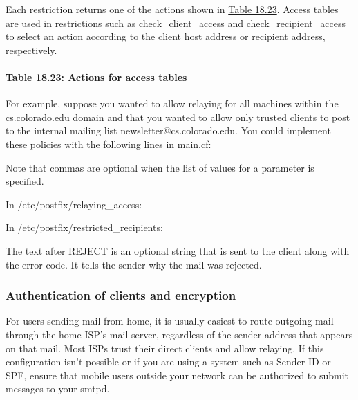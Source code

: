 Each restriction returns one of the actions shown in
\protect\hyperlink{part0026_split_063.htmlux5cux23_idTextAnchor1192}{Table
18.23}. Access tables are used in restrictions such as
{check\_client\_access} and {check\_recipient\_access} to select an
action according to the client host address or recipient address,
respectively.

\paragraph[{Table 18.23: }Actions for access
tables]{\texorpdfstring{{Table 18.23:
}\protect\hypertarget{part0026_split_063.htmlux5cux23_idTextAnchor1192}{}{}Actions
for access tables}{Table 18.23: Actions for access tables}}


For example, suppose you wanted to allow relaying for all machines
within the {cs.colorado.edu} domain and that you wanted to allow only
trusted clients to post to the internal mailing list
{newsletter@cs.colorado.edu}. You could implement these policies with
the following lines in
{main.cf}:\protect\hypertarget{part0026_split_063.htmlux5cux23_idIndexMarker2731}{}{}


Note that commas are optional when the list of values for a parameter is
specified.

In
{/}{\protect\hypertarget{part0026_split_063.htmlux5cux23_idIndexMarker2732}{}{}}{etc/postfix/relaying\_access}:


In
\protect\hypertarget{part0026_split_063.htmlux5cux23_idIndexMarker2733}{}{}{/etc/postfix/restricted\_recipients}:


The text after {REJECT} is an optional string that is sent to the client
along with the error code. It tells the sender why the mail was
rejected.

\subsubsection[Authentication of clients and
encryption]{\texorpdfstring{\protect\hypertarget{part0026_split_063.htmlux5cux23_idTextAnchor1193}{}{}Authentication
of clients and encryption}{Authentication of clients and encryption}}

\protect\hypertarget{part0026_split_063.htmlux5cux23_idIndexMarker2734}{}{}For
users sending mail from home, it is usually easiest to route outgoing
mail through the home ISP's mail server, regardless of the sender
address that appears on that mail. Most ISPs trust their direct clients
and allow relaying. If this configuration isn't possible or if you are
using a system such as Sender ID or SPF, ensure that mobile users
outside your network can be authorized to submit messages to your
{smtpd}.

